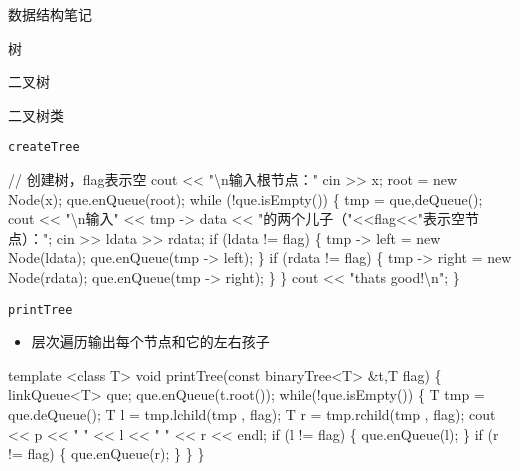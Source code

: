 \documentclass[
  ignorenonframetext,
]{beamer}
\newenvironment{Shaded}{}{}
\newcommand{\NormalTok}[1]{#1}
\providecommand{\tightlist}{%
  \setlength{\itemsep}{0pt}\setlength{\parskip}{0pt}}
\begin{document}
\begin{frame}[fragile]{数据结构笔记}
\begin{block}{树}
\begin{block}{二叉树}
\begin{block}{二叉树类}
\begin{block}{\texttt{createTree}}
\begin{Shaded}
\begin{Highlighting}[]
\NormalTok{  // 创建树，flag表示空}
\NormalTok{  cout \textless{}\textless{} "\textbackslash{}n输入根节点："}
\NormalTok{  cin \textgreater{}\textgreater{} x;}
\NormalTok{  root = new Node(x);}
\NormalTok{  que.enQueue(root);}
\NormalTok{  while (!que.isEmpty())}
\NormalTok{  \{}
\NormalTok{    tmp = que,deQueue();}
\NormalTok{    cout \textless{}\textless{} "\textbackslash{}n输入" \textless{}\textless{} tmp {-}\textgreater{} data \textless{}\textless{} "的两个儿子（"\textless{}\textless{}flag\textless{}\textless{}"表示空节点）：";}
\NormalTok{    cin \textgreater{}\textgreater{} ldata \textgreater{}\textgreater{} rdata;}
\NormalTok{    if (ldata != flag)}
\NormalTok{    \{}
\NormalTok{      tmp {-}\textgreater{} left = new Node(ldata);}
\NormalTok{      que.enQueue(tmp {-}\textgreater{} left);}
\NormalTok{    \}}
\NormalTok{    if (rdata != flag)}
\NormalTok{    \{}
\NormalTok{      tmp {-}\textgreater{} right = new Node(rdata);}
\NormalTok{      que.enQueue(tmp {-}\textgreater{} right);}
\NormalTok{    \}}
\NormalTok{  \}}
\NormalTok{  cout \textless{}\textless{} "that\textquotesingle{}s good!\textbackslash{}n";}
\NormalTok{\}}
\end{Highlighting}
\end{Shaded}
\end{block}

\begin{block}{\texttt{printTree}}
\protect{}\label{printtree}
\begin{itemize}
\tightlist
\item
  层次遍历输出每个节点和它的左右孩子
\end{itemize}

\begin{Shaded}
\begin{Highlighting}[]
\NormalTok{template \textless{}class T\textgreater{}}
\NormalTok{void printTree(const binaryTree\textless{}T\textgreater{} \&t,T flag)}
\NormalTok{\{}
\NormalTok{  linkQueue\textless{}T\textgreater{} que;}
\NormalTok{  que.enQueue(t.root());}
\NormalTok{  while(!que.isEmpty())}
\NormalTok{  \{}
\NormalTok{    T tmp = que.deQueue();}
\NormalTok{    T l = tmp.lchild(tmp , flag);}
\NormalTok{    T r = tmp.rchild(tmp , flag);}
\NormalTok{    cout \textless{}\textless{} p \textless{}\textless{} " " \textless{}\textless{} l \textless{}\textless{} " " \textless{}\textless{} r \textless{}\textless{} endl;}
\NormalTok{    if (l != flag)}
\NormalTok{    \{}
\NormalTok{      que.enQueue(l);}
\NormalTok{    \}}
\NormalTok{    if (r != flag)}
\NormalTok{    \{}
\NormalTok{      que.enQueue(r);}
\NormalTok{    \}}
\NormalTok{  \}}
\NormalTok{\}}
\end{Highlighting}
\end{Shaded}
\end{block}
\end{block}


\end{block}
\end{block}
\end{frame}
\end{document}
